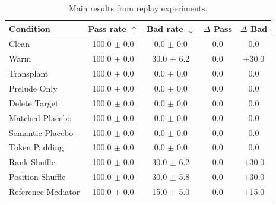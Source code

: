 \begin{table}[t]
\centering\small\setlength{\tabcolsep}{4pt}
\begin{tabular}{lcccc}
\toprule
Condition & Pass rate $\uparrow$ & Bad rate $\downarrow$ & $\Delta$ Pass & $\Delta$ Bad \\
\midrule
Clean & 100.0 $\pm$ 0.0 & 0.0 $\pm$ 0.0 & 0.0 & 0.0 \\
Warm & 100.0 $\pm$ 0.0 & 30.0 $\pm$ 6.2 & 0.0 & +30.0 \\
Transplant & 100.0 $\pm$ 0.0 & 0.0 $\pm$ 0.0 & 0.0 & 0.0 \\
Prelude Only & 100.0 $\pm$ 0.0 & 0.0 $\pm$ 0.0 & 0.0 & 0.0 \\
Delete Target & 100.0 $\pm$ 0.0 & 0.0 $\pm$ 0.0 & 0.0 & 0.0 \\
Matched Placebo & 100.0 $\pm$ 0.0 & 0.0 $\pm$ 0.0 & 0.0 & 0.0 \\
Semantic Placebo & 100.0 $\pm$ 0.0 & 0.0 $\pm$ 0.0 & 0.0 & 0.0 \\
Token Padding & 100.0 $\pm$ 0.0 & 0.0 $\pm$ 0.0 & 0.0 & 0.0 \\
Rank Shuffle & 100.0 $\pm$ 0.0 & 30.0 $\pm$ 6.2 & 0.0 & +30.0 \\
Position Shuffle & 100.0 $\pm$ 0.0 & 30.0 $\pm$ 5.8 & 0.0 & +30.0 \\
Reference Mediator & 100.0 $\pm$ 0.0 & 15.0 $\pm$ 5.0 & 0.0 & +15.0 \\
\bottomrule
\end{tabular}
\caption{Main results from replay experiments.}
\label{tab:main}
\end{table}